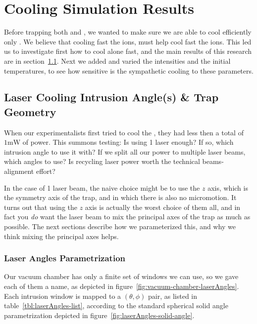 \chapter{Cooling Simulation Results}\label{chap:results}

Before trapping both  and , we wanted to make sure we are able to cool efficiently only . We believe that cooling fast the  ions, must help cool fast the  ions. This led us to investigate first how to cool  alone fast, and the main results of this research are in section~\ref{sec:results/laserAngles}. Next we added  and varied the intensities and the initial temperatures, to see how sensitive is the sympathetic cooling to these parameters.

\section{Laser Cooling Intrusion Angle(s) \& Trap Geometry}\label{sec:results/laserAngles}

When our experimentalists first tried to cool the , they had less then a total of $1\mathrm{mW}$ of power. This summons testing: Is using 1 laser enough? If so, which intrusion angle to use it with? If we split all our power to multiple laser beams, which angles to use? Is recycling laser power worth the technical beams-alignment effort?

In the case of 1 laser beam, the naive choice might be to use the $z$ axis, which is the symmetry axis of the trap, and in which there is also no micromotion. It turns out that using the $z$ axis is actually the worst choice of them all, and in fact you \emph{do} want the laser beam to mix the principal axes of the trap as much as possible. The next sections describe how we parameterized this, and why we think mixing the principal axes helps.

\subsection{Laser Angles Parametrization}

Our vacuum chamber has only a finite set of windows we can use, so we gave each of them a name, as depicted in figure~\ref{fig:vacuum-chamber-laserAngles}. Each intrusion window is mapped to a $(\theta, \phi)$ pair, as listed in table~\ref{tbl:laserAngles-list}, according to the standard spherical solid angle parametrization depicted in figure~\ref{fig:laserAngles-solid-angle}.

